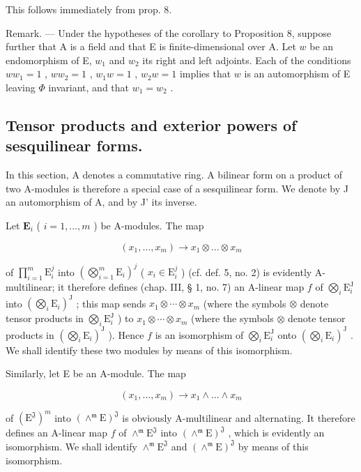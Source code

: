 This follows immediately from prop. 8.

Remark. --- Under the hypotheses of the corollary to Proposition 8, suppose further that A is a field and that E is finite-dimensional over A. Let \(w\) be an endomorphism of E, \(w_{1}\) and \(w_{2}\) its right and left adjoints. Each of the conditions \(ww_{1}=1\) , \(ww_{2}=1\) , \(w_{1}w=1\) , \(w_{2}w=1\) implies that \(w\) is an automorphism of E leaving \(\Phi\) invariant, and that \(w_{1}=w_{2}\) .

\subsection{Tensor products and exterior powers of sesquilinear forms.}

In this section, A denotes a commutative ring. A bilinear form on a product of two A-modules is therefore a special case of a sesquilinear form. We denote by J an automorphism of A, and by J' its inverse.

Let \(\mathbf{E}_i\) ( \(i = 1, \ldots, m\) ) be A-modules. The map

\[
(x _ {1}, \dots , x _ {m}) \rightarrow x _ {1} \otimes \dots \otimes x _ {m}
\]

of \(\prod_{i=1}^{m}\mathrm{E}_{i}^{j}\) into \((\bigotimes_{i=1}^{m}\mathrm{E}_{i})^{j}\) ( \(x_{i}\in\mathrm{E}_{i}^{j}\) ) (cf. def. 5, no. 2) is evidently A-multilinear; it therefore defines (chap. III, § 1, no. 7) an A-linear map \(f\) of \(\bigotimes_{i}\mathrm{E}_{i}^{\mathrm{J}}\) into \((\bigotimes_{i}\mathrm{E}_{i})^{\mathrm{J}}\) ; this map sends \(x_{1}\otimes\cdots\otimes x_{m}\) (where the symbols \(\otimes\) denote tensor products in \(\bigotimes_{i}\mathrm{E}_{i}^{\mathrm{J}}\) ) to \(x_{1}\otimes\cdots\otimes x_{m}\) (where the symbols \(\otimes\) denote tensor products in \((\bigotimes_{i}\mathrm{E}_{i})^{\mathrm{J}}\) ). Hence \(f\) is an isomorphism of \(\bigotimes_{i}\mathrm{E}_{i}^{\mathrm{J}}\) onto \((\bigotimes_{i}\mathrm{E}_{i})^{\mathrm{J}}\) . We shall identify these two modules by means of this isomorphism.

Similarly, let E be an A-module. The map

\[
(x _ {1}, \dots , x _ {m}) \rightarrow x _ {1} \wedge \dots \wedge x _ {m}
\]

of \((\mathrm{E}^{\mathfrak{J}})^{m}\) into \((\wedge^{\mathfrak{m}}\mathrm{E})^{\mathfrak{J}}\) is obviously A-multilinear and alternating. It therefore defines an A-linear map \(f\) of \(\wedge^{\mathfrak{m}}\mathrm{E}^{\mathfrak{J}}\) into \((\wedge^{\mathfrak{m}}\mathrm{E})^{\mathfrak{J}}\) , which is evidently an isomorphism. We shall identify \(\wedge^{\mathfrak{m}}\mathrm{E}^{\mathfrak{J}}\) and \((\wedge^{\mathfrak{m}}\mathrm{E})^{\mathfrak{J}}\) by means of this isomorphism.

